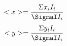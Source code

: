 \documentclass[letterpaper,12pt]{article}
\begin{document}
\begin{equation}
<x>=\frac {\Sigma x_{i}I_{i}}{\SigmaI I_{i}}
\end{equation}
\begin{equation}
<y>=\frac {\Sigma y_{i}I_{i}}{\SigmaI I_{i}}
\end{equation}

\begin{figure}[h!]
                                                                                                                                                                                                                                                                                                                                                                                                                                                                                                                                                                                                                                                                                                                                                                                                                                                                                                                                                                                                                                                                                                                                                                                                                                                                                                                                                                                                                                                                                                                                                                                                                                                                                                                                                                                                                                                                                                                                                                                                                                                                                                                                                                                                                                                                                                                                                                                                                                                                                                                                                                                                                                                                                                                                                                                                                                                                                                                                                                                                                                  
\end{figure}
\end{document}
